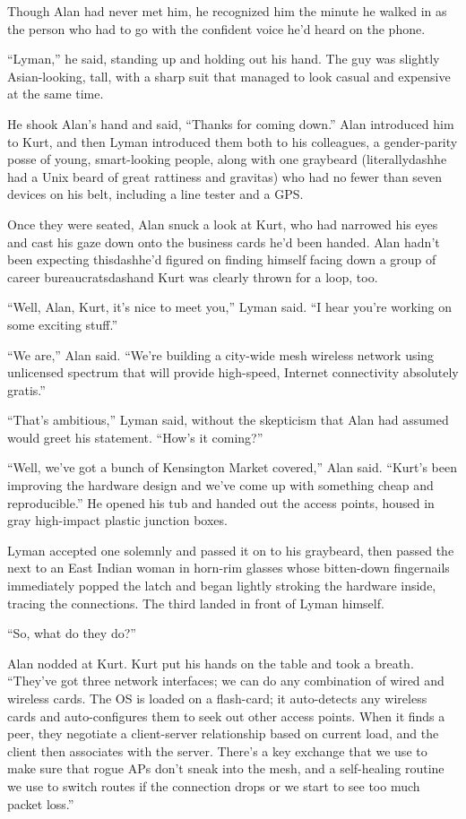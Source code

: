 Though Alan had never met him, he recognized him the minute he walked
in as the person who had to go with the confident voice he'd heard on
the phone.

``Lyman,'' he said, standing up and holding out his hand.  The guy was
slightly Asian-looking, tall, with a sharp suit that managed to look
casual and expensive at the same time.

He shook Alan's hand and said, ``Thanks for coming down.'' Alan
introduced him to Kurt, and then Lyman introduced them both to his
colleagues, a gender-parity posse of young, smart-looking people,
along with one graybeard (literallydash{}he had a Unix beard of great
rattiness and gravitas) who had no fewer than seven devices on his
belt, including a line tester and a GPS.

Once they were seated, Alan snuck a look at Kurt, who had narrowed his
eyes and cast his gaze down onto the business cards he'd been handed. 
Alan hadn't been expecting thisdash{}he'd figured on finding himself
facing down a group of career bureaucratsdash{}and Kurt was clearly
thrown for a loop, too.

``Well, Alan, Kurt, it's nice to meet you,'' Lyman said.  ``I hear
you're working on some exciting stuff.''

``We are,'' Alan said.  ``We're building a city-wide mesh wireless
network using unlicensed spectrum that will provide high-speed,
Internet connectivity absolutely gratis.''

``That's ambitious,'' Lyman said, without the skepticism that Alan had
assumed would greet his statement.  ``How's it coming?''

``Well, we've got a bunch of Kensington Market covered,'' Alan said. 
``Kurt's been improving the hardware design and we've come up with
something cheap and reproducible.'' He opened his tub and handed out
the access points, housed in gray high-impact plastic junction boxes.

Lyman accepted one solemnly and passed it on to his graybeard, then
passed the next to an East Indian woman in horn-rim glasses whose
bitten-down fingernails immediately popped the latch and began lightly
stroking the hardware inside, tracing the connections.  The third
landed in front of Lyman himself.

``So, what do they do?''

Alan nodded at Kurt.  Kurt put his hands on the table and took a
breath.  ``They've got three network interfaces; we can do any
combination of wired and wireless cards.  The OS is loaded on a
flash-card; it auto-detects any wireless cards and auto-configures
them to seek out other access points.  When it finds a peer, they
negotiate a client-server relationship based on current load, and the
client then associates with the server.  There's a key exchange that
we use to make sure that rogue APs don't sneak into the mesh, and a
self-healing routine we use to switch routes if the connection drops
or we start to see too much packet loss.''


